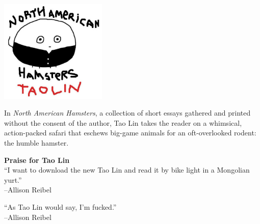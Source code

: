 \documentclass[10pt,twoside,openright]{memoir}
\begin{document}


\begin{vplace}
\begin{center}
  \includegraphics[width=2in]{img/cover}
\end{center}
\end{vplace}

\pagebreak
\mbox{}


\pagebreak
\mbox{}


\pagebreak

\begin{vplace}
\noindent
In {\em North American Hamsters}, a collection of short essays gathered and 
printed without the consent of the author, Tao Lin takes the reader on a
whimsical, action-packed safari that eschews big-game animals for an
oft-overlooked rodent: the humble hamster.

\begin{center}
\textbf{Praise for Tao Lin}
\\[1em]

``I want to download the new Tao Lin and read it by bike light in a Mongolian
yurt.''\\
--Allison Reibel

\vspace{1em}

``As Tao Lin would say, I'm fucked.'' \\
--Allison Reibel
\end{center}
\end{vplace}
\end{document}
